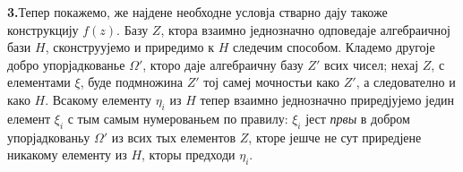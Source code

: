 ﻿\documentclass[11pt]{article}
\begin{document}

\medskip
\noindent\textbf{3.}\quad Тепер покажемо, же најдене необходне условја стварно дају такоже конструкцију \(f(z)\). Базу \(Z\), ктора взаимно једнозначно одповедаје алгебраичној бази \(H\), сконструујемо и приредимо к \(H\) следечим способом. Кладемо другоје добро упорјадкованье \(\Omega'\), кторо даје алгебраичну базу \(Z'\) всих чисел; нехај \(Z\), с елементами \(\xi\), буде подмножина \(Z'\) тој самеј мочностьи како \(Z'\), а следователно и како \(H\). Всакому елементу \(\eta_i\) из \(H\) тепер взаимно једнозначно приредјујемо једин елемент \(\xi_i\) с тым самым нумерованьем по правилу: \(\xi_i\) јест {\itshape првы} в добром упорјадкованьу \(\Omega'\) из всих тых елементов \(Z\), кторе јешче не сут приредјене никакому елементу из \(H\), кторы предходи \(\eta_i\).
\end{document}
